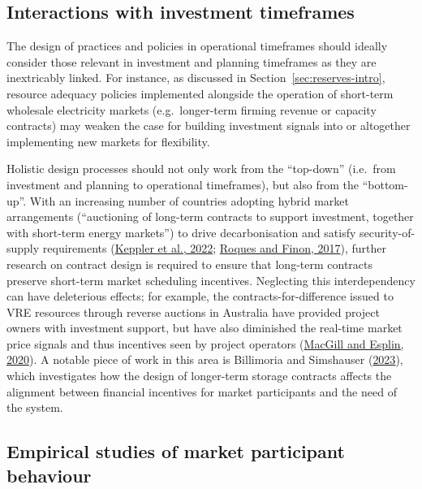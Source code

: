 \documentclass[12pt,a4paper,]{report}
\begin{document}
\hypertarget{interactions-with-investment-timeframes}{%
\subsection{Interactions with investment
timeframes}\label{interactions-with-investment-timeframes}}

The design of practices and policies in operational timeframes should
ideally consider those relevant in investment and planning timeframes as
they are inextricably linked. For instance, as discussed in
Section~\ref{sec:reserves-intro}, resource adequacy policies implemented
alongside the operation of short-term wholesale electricity markets
(e.g.~longer-term firming revenue or capacity contracts) may weaken the
case for building investment signals into or altogether implementing new
markets for flexibility.

Holistic design processes should not only work from the ``top-down''
(i.e.~from investment and planning to operational timeframes), but also
from the ``bottom-up''. With an increasing number of countries adopting
hybrid market arrangements (``auctioning of long-term contracts to
support investment, together with short-term energy markets'') to drive
decarbonisation and satisfy security-of-supply requirements
(\protect\hyperlink{ref-kepplerWhySustainableProvision2022}{Keppler et
al., 2022};
\protect\hyperlink{ref-roquesAdaptingElectricityMarkets2017}{Roques and
Finon, 2017}), further research on contract design is required to ensure
that long-term contracts preserve short-term market scheduling
incentives. Neglecting this interdependency can have deleterious
effects; for example, the contracts-for-difference issued to VRE
resources through reverse auctions in Australia have provided project
owners with investment support, but have also diminished the real-time
market price signals and thus incentives seen by project operators
(\protect\hyperlink{ref-macgillEndtoendElectricityMarket2020}{MacGill
and Esplin, 2020}). A notable piece of work in this area is Billimoria
and Simshauser
(\protect\hyperlink{ref-billimoriaContractDesignStorage2023a}{2023}),
which investigates how the design of longer-term storage contracts
affects the alignment between financial incentives for market
participants and the need of the system.

\hypertarget{empirical-studies-of-market-participant-behaviour}{%
\subsection{Empirical studies of market participant
behaviour}\label{empirical-studies-of-market-participant-behaviour}}
\end{document}
